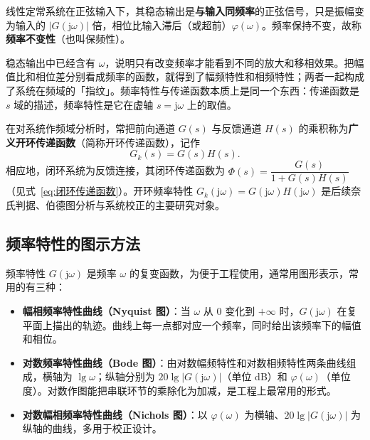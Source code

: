 \begin{property}[频率不变性]
线性定常系统在正弦输入下，其稳态输出是\textbf{与输入同频率}的正弦信号，只是振幅变为输入的 $\left|G(\mathrm{j}\omega)\right|$ 倍，相位比输入滞后（或超前）$\varphi(\omega)$。频率保持不变，故称\textbf{频率不变性}（也叫保频性）。
\end{property}

\begin{remark}
稳态输出中已经含有 $\omega$，说明只有改变频率才能看到不同的放大和移相效果。把幅值比和相位差分别看成频率的函数，就得到了幅频特性和相频特性；两者一起构成了系统在频域的「指纹」。频率特性与传递函数本质上是同一个东西：传递函数是 $s$ 域的描述，频率特性是它在虚轴 $s=\mathrm{j}\omega$ 上的取值。
\end{remark}

\begin{definition}[广义开环系统]
在对系统作频域分析时，常把前向通道 $G(s)$ 与反馈通道 $H(s)$ 的乘积称为\textbf{广义开环传递函数}（简称开环传递函数），记作
\begin{equation}
G_{k}(s)=G(s)H(s).
\label{eq:广义开环传递函数}
\end{equation}
相应地，闭环系统为反馈连接，其闭环传递函数为 $\Phi(s)=\dfrac{G(s)}{1+G(s)H(s)}$（见式~\eqref{eq:闭环传递函数}）。开环频率特性 $G_{k}(\mathrm{j}\omega)=G(\mathrm{j}\omega)H(\mathrm{j}\omega)$ 是后续奈氏判据、伯德图分析与系统校正的主要研究对象。
\end{definition}

\subsection{频率特性的图示方法}
\label{sec:频率特性的图示方法}

频率特性 $G(\mathrm{j}\omega)$ 是频率 $\omega$ 的复变函数，为便于工程使用，通常用图形表示，常用的有三种：

\begin{itemize}
\item \textbf{幅相频率特性曲线（Nyquist 图）}：当 $\omega$ 从 $0$ 变化到 $+\infty$ 时，$G(\mathrm{j}\omega)$ 在复平面上描出的轨迹。曲线上每一点都对应一个频率，同时给出该频率下的幅值和相位。
\item \textbf{对数频率特性曲线（Bode 图）}：由对数幅频特性和对数相频特性两条曲线组成，横轴为 $\lg\omega$；纵轴分别为 $20\lg\left|G(\mathrm{j}\omega)\right|$（单位 dB）和 $\varphi(\omega)$（单位度）。对数作图能把串联环节的乘除化为加减，是工程上最常用的形式。
\item \textbf{对数幅相频率特性曲线（Nichols 图）}：以 $\varphi(\omega)$ 为横轴、$20\lg\left|G(\mathrm{j}\omega)\right|$ 为纵轴的曲线，多用于校正设计。
\end{itemize}

